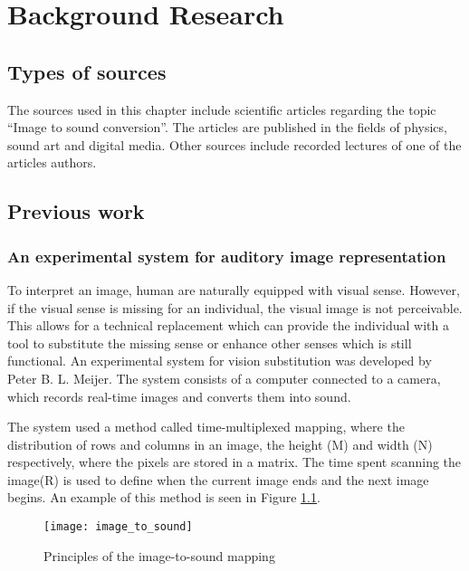 \chapter{Background Research}\label{ch:bgresearch}



\section{Types of sources}\label{sec:typesofsources} 
The sources used in this chapter include scientific articles regarding the topic “Image to sound conversion”. The articles are published in the fields of physics, sound art and digital media. Other sources include recorded lectures of one of the articles authors.

\section{Previous work}\label{sec:previouswork}

\subsection{An experimental system for auditory image representation}\label{sec:experimentalsystem}

To interpret an image, human are naturally equipped with visual sense. However, if the visual sense is missing for an individual, the visual image is not perceivable. This allows for a technical replacement which can provide the individual with a tool to substitute the missing sense or enhance other senses which is still functional. An experimental system for vision substitution was developed by Peter B. L. Meijer\cite{Meijer1992}. The system consists of a computer connected to a camera, which records real-time images and converts them into sound. 

The system used a method called time-multiplexed mapping, where the distribution of rows and columns in an image, the height (M) and width (N) respectively, where the pixels are stored in a matrix. The time spent scanning the image(R) is used to define when the current image ends and the next image begins. An example of this method is seen in Figure \ref{fig:image_to_sound}. 

\begin{figure}[!h] 
\centering
\texttt{[image: image\_to\_sound]}
\caption{\label{fig:image_to_sound} Principles of the image-to-sound mapping \cite{Meijer1992}}
\end{figure}

